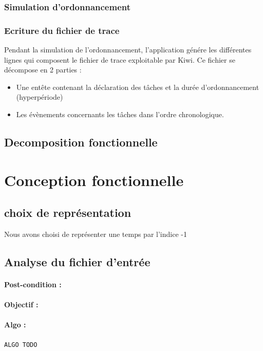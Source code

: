 			\subsubsection{Simulation d'ordonnancement}
				
			
			\subsubsection{Ecriture du fichier de trace}
				Pendant la simulation de l'ordonnancement, l'application génére les différentes lignes qui composent le fichier de trace exploitable par Kiwi. Ce fichier se décompose en 2 parties :
					\begin{itemize}
						\item Une entête contenant la déclaration des tâches et la durée d'ordonnancement (hyperpériode)
						\item Les évènements concernants les tâches dans l'ordre chronologique.
					\end{itemize}
		\subsection{Decomposition fonctionnelle}

	\section{Conception fonctionnelle}
		
		\subsection{choix de représentation}
			Nous avons choisi de représenter une temps par l'indice -1
						
		\subsection{Analyse du fichier d'entrée}
				\paragraph{Post-condition :} 
				\paragraph{Objectif :} 
				\paragraph{Algo :} 
					\begin{verbatim}
ALGO TODO
					\end{verbatim}
		

